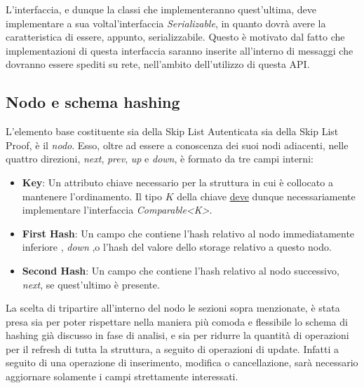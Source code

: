 		L'interfaccia, e dunque la classi che implementeranno quest'ultima, deve implementare a sua voltal'interfaccia \textit{Serializable}, in quanto dovrà avere la caratteristica di essere, appunto, serializzabile. Questo è motivato dal fatto che implementazioni di questa interfaccia saranno inserite all'interno di messaggi che dovranno essere spediti su rete, nell'ambito dell'utilizzo di questa API.
	
	\subsection{Nodo e schema hashing}
	
	
	L'elemento base costituente sia della Skip List Autenticata sia della Skip List Proof, è il \textit{nodo}. Esso, oltre ad essere a conoscenza dei suoi nodi adiacenti, nelle quattro direzioni, \textit{next}, \textit{prev},  \textit{up} e \textit{down}, è formato da tre campi interni:
	\begin{itemize}
		\item \textbf{Key}: Un attributo chiave necessario per la struttura in cui è collocato a mantenere l'ordinamento. Il tipo $ K $ della chiave \underline{deve} dunque necessariamente implementare l'interfaccia \textit{Comparable<K>}.
		\item \textbf{First Hash}: Un campo che contiene l'hash relativo al nodo immediatamente inferiore , \textit{down} ,o l'hash del valore dello storage relativo a questo nodo.
		\item \textbf{Second Hash}: Un campo che contiene l'hash relativo al nodo successivo,  \textit{next}, se quest'ultimo è presente.
	\end{itemize}

	La scelta di tripartire all'interno del nodo le sezioni sopra menzionate, è stata presa sia per poter rispettare nella maniera più comoda e flessibile lo schema di hashing già discusso in fase di analisi, e sia per ridurre la quantità di operazioni per il refresh di tutta la struttura, a seguito di operazioni di update. Infatti a seguito di una operazione di inserimento, modifica o cancellazione, sarà necessario aggiornare solamente i campi strettamente interessati.
	
